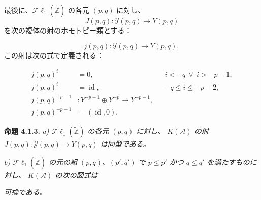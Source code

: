 \clearpage
{}%
\begingroup\small\setlength{\parskip}{0pt}\setlength{\emergencystretch}{1.5em}
\setlength{\abovedisplayskip}{4pt plus 2pt minus 2pt}%
\setlength{\belowdisplayskip}{4pt plus 2pt minus 2pt}%

最後に、$\mathcal{F}\ell_1(\widetilde{\mathbb Z})$ の各元 $(p,q)$ に対し、
\begin{equation}
J(p,q)\colon\mathcal Y(p,q)\longrightarrow Y(p,q)
\tag{4.1.2.9}
\end{equation}
を次の複体の射のホモトピー類とする：

\begin{equation}
j(p,q)\colon\mathcal Y(p,q)\longrightarrow Y(p,q),
\tag{4.1.2.10}
\end{equation}
この射は次の式で定義される：

\begin{equation}
\begin{aligned}
j(p,q)^i&=0,
  &&i<-q\ \lor\ i>-p-1,\\
j(p,q)^i&=\operatorname{id},
  &&-q\leq i\leq-p-2,\\
j(p,q)^{-p-1}&\colon
  Y^{-p-1}\oplus Y^{-p}\longrightarrow Y^{-p-1},\\
j(p,q)^{-p-1}&=(\operatorname{id},0).
\end{aligned}
\tag{4.1.2.11}
\end{equation}

\medskip\noindent\textbf{命題 4.1.3.}\quad
\textit{a) $\mathcal{F}\ell_1(\widetilde{\mathbb Z})$ の各元 $(p,q)$ に対し、
$K(\mathcal A)$ の射
$J(p,q)\colon\mathcal Y(p,q)\longrightarrow Y(p,q)$ は同型である。}

\noindent\textit{b) $\mathcal{F}\ell_1(\widetilde{\mathbb Z})$ の元の組
$(p,q)$、$(p',q')$ で $p\leq p'$ かつ $q\leq q'$ を満たすものに対し、
$K(\mathcal A)$ の次の図式は}

\begin{center}
\end{center}
\noindent\textit{可換である。}

